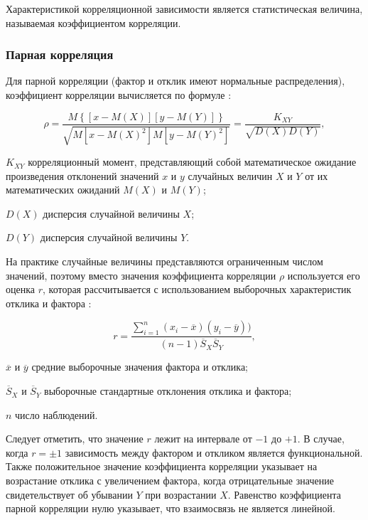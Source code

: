 Характеристикой корреляционной зависимости является статистическая величина, называемая коэффициентом корреляции. \cite{corelMethod}

\subsubsection{Парная корреляция}

Для парной корреляции (фактор и отклик имеют нормальные распределения), коэффициент корреляции вычисляется по формуле \cite{corelMethod}:

\begin{equation}
\label{eq:corelPara}
\rho = \frac{M\left \{\left[x-M\left(X\right)\right]\left[y-M(Y)\right]\right \}}{\sqrt{M\left[x-M\left(X\right)^2\right]M\left[y-M\left(Y\right)^2\right]}} = \frac{K_{XY}}{\sqrt{D\left(X\right)D\left (Y\right)}},
\end{equation}
\begin{eqexpl}[15mm]
\item{$K_{XY}$} корреляционный момент, представляющий собой математическое ожидание произведения отклонений значений $x$ и $y$ случайных величин $X$ и $Y$ от их математических ожиданий $M(X)$ и $M(Y)$;
\item{$D(X)$} дисперсия случайной величины $X$;
\item{$D(Y)$} дисперсия случайной величины $Y$.
\end{eqexpl}

На практике случайные величины представляются ограниченным числом значений, поэтому вместо значения коэффициента корреляции $\rho$ используется его оценка $r$, которая рассчитывается с использованием выборочных характеристик отклика и фактора \cite{corelMethod}:

\begin{equation}
\label{eq:corelMark}
r = \frac{\sum_{i = 1}^{n}(x_i - \overline{x})(y_i - \overline{y}))}{(n - 1)\overline{S}_X \overline{S}_Y},
\end{equation}
\begin{eqexpl}[20mm]
\item{$\overline{x}$ и $\overline{y}$} средние выборочные значения фактора и отклика;
\item{$\overline{S}_X$ и $\overline{S}_Y$} выборочные стандартные отклонения отклика и фактора;
\item{$n$} число наблюдений.
\end{eqexpl}

Следует отметить, что значение $r$ лежит на интервале от $-1$ до $+1$. В случае, когда $r=\pm1$ зависимость между фактором и откликом является функциональной. Также положительное значение коэффициента корреляции указывает на возрастание отклика с увеличением фактора, когда отрицательные значение свидетельствует об убывании $Y$ при возрастании $X$. Равенство коэффициента парной корреляции нулю указывает, что взаимосвязь не является линейной. \cite{corelMethod}

